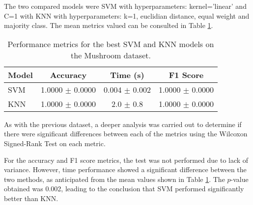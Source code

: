 The two compared models were SVM with hyperparameters: kernel='linear' and C=1 with KNN with hyperparameters: k=1, euclidian distance, equal weight and majority class. The mean metrics valued can be consulted in Table \ref{tab:svm-knn-mushroom}. \newline

\begin{table}[h!]
\centering
\begin{tabular}{lccc}
\hline
\textbf{Model} & \textbf{Accuracy} & \textbf{Time (s)} & \textbf{F1 Score} \\
\hline
SVM & 1.0000 $\pm$ 0.0000 & 0.004 $\pm$ 0.002 & 1.0000 $\pm$ 0.0000 \\
\hline
KNN & 1.0000 $\pm$ 0.0000 & 2.0 $\pm$ 0.8 & 1.0000 $\pm$ 0.0000 \\
\hline
\end{tabular}
\caption{Performance metrics for the best SVM and KNN models on the Mushroom dataset.}
\label{tab:svm-knn-mushroom}
\end{table}

As with the previous dataset, a deeper analysis was carried out to determine if there were significant differences between each of the metrics using the Wilcoxon Signed-Rank Test on each metric.

For the accuracy and F1 score metrics, the test was not performed due to lack of variance. However, time performance showed a significant difference between the two methods, as anticipated from the mean values shown in Table \ref{tab:svm-knn-mushroom}. The $p$-value obtained was 0.002, leading to the conclusion that SVM performed significantly better than KNN.
